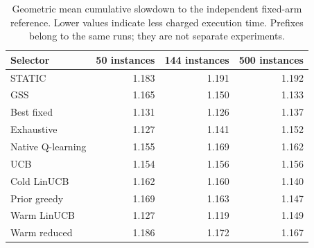 \begin{table}[ht]
\centering\small
\caption{Geometric mean cumulative slowdown to the independent fixed-arm
reference. Lower values indicate less charged execution time. Prefixes
belong to the same runs; they are not separate experiments.}
\label{tab:summary}
\begin{tabular}{lrrr}
\hline
Selector & 50 instances & 144 instances & 500 instances\\
\hline
STATIC & 1.183 & 1.191 & 1.192 \\
GSS & 1.165 & 1.150 & 1.133 \\
Best fixed & 1.131 & 1.126 & 1.137 \\
Exhaustive & 1.127 & 1.141 & 1.152 \\
Native Q-learning & 1.155 & 1.169 & 1.162 \\
UCB & 1.154 & 1.156 & 1.156 \\
Cold LinUCB & 1.162 & 1.160 & 1.140 \\
Prior greedy & 1.169 & 1.163 & 1.147 \\
Warm LinUCB & 1.127 & 1.119 & 1.149 \\
Warm reduced & 1.186 & 1.172 & 1.167 \\
\hline
\end{tabular}
\end{table}
